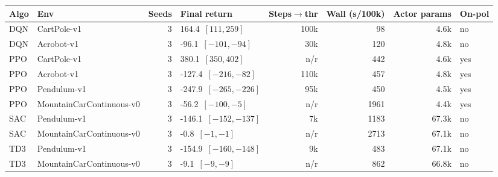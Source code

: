 \begin{tabular}{llrlrrrl}
\toprule
Algo & Env & Seeds & Final return & Steps$\to$thr & Wall (s/100k) & Actor params & On-pol \\
\midrule
DQN & CartPole-v1 & 3 & 164.4\ \([111,259]\) & 100k & 98 & 4.6k & no \\
DQN & Acrobot-v1 & 3 & -96.1\ \([-101,-94]\) & 30k & 120 & 4.8k & no \\
PPO & CartPole-v1 & 3 & 380.1\ \([350,402]\) & n/r & 442 & 4.6k & yes \\
PPO & Acrobot-v1 & 3 & -127.4\ \([-216,-82]\) & 110k & 457 & 4.8k & yes \\
PPO & Pendulum-v1 & 3 & -247.9\ \([-265,-226]\) & 95k & 450 & 4.5k & yes \\
PPO & MountainCarContinuous-v0 & 3 & -56.2\ \([-100,-5]\) & n/r & 1961 & 4.4k & yes \\
SAC & Pendulum-v1 & 3 & -146.1\ \([-152,-137]\) & 7k & 1183 & 67.3k & no \\
SAC & MountainCarContinuous-v0 & 3 & -0.8\ \([-1,-1]\) & n/r & 2713 & 67.1k & no \\
TD3 & Pendulum-v1 & 3 & -154.9\ \([-160,-148]\) & 9k & 483 & 67.1k & no \\
TD3 & MountainCarContinuous-v0 & 3 & -9.1\ \([-9,-9]\) & n/r & 862 & 66.8k & no \\
\bottomrule
\end{tabular}